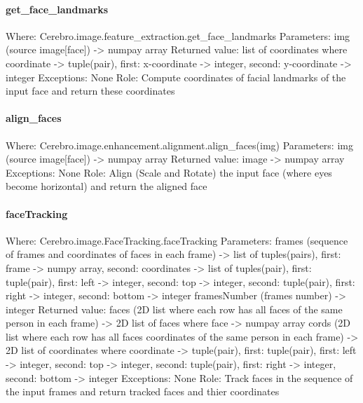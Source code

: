\paragraph{get_face_landmarks}
Where: Cerebro.image.feature_extraction.get_face_landmarks \newline
Parameters: img (source image[face]) -> numpay array \newline
Returned value: list of coordinates where coordinate -> tuple(pair), first: x-coordinate -> integer, second: y-coordinate -> integer \newline
Exceptions: None \newline
Role: Compute coordinates of facial landmarks of the input face and return these coordinates
\paragraph{align_faces}
Where: Cerebro.image.enhancement.alignment.align_faces(img) \newline
Parameters: img (source image[face]) -> numpay array \newline
Returned value: image -> numpay array \newline
Exceptions: None \newline
Role: Align (Scale and Rotate) the input face (where eyes become horizontal) and return the aligned face
\paragraph{faceTracking}
Where: Cerebro.image.FaceTracking.faceTracking \newline
Parameters: frames (sequence of frames and coordinates of faces in each frame) -> \newline
list of tuples(pairs), first: frame -> numpy array, second: coordinates -> \newline
list of tuples(pair), first: tuple(pair), first: left -> integer, second: top -> integer, second: tuple(pair), first: right -> integer, second: bottom -> integer \newline
framesNumber (frames number) -> integer \newline
Returned value: \newline
faces (2D list where each row has all faces of the same person in each frame) -> 2D list of faces where face -> numpay array \newline
cords (2D list where each row has all faces coordinates of the same person in each frame) -> 2D list of coordinates where coordinate -> \newline
tuple(pair), first: tuple(pair), first: left -> integer, second: top -> integer, second: tuple(pair), first: right -> integer, second: bottom -> integer \newline
Exceptions: None \newline
Role: Track faces in the sequence of the input frames and return tracked faces and thier coordinates 